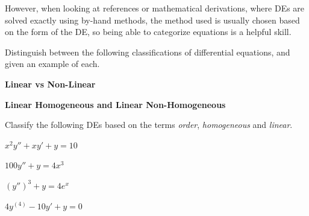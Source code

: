 However, when looking at references or mathematical derivations, where
DEs are solved exactly using by-hand methods, the method used is
usually chosen based on the form of the DE, so being able to
categorize equations is a helpful skill.

\newpage

\problem Distinguish between the following classifications of
differential equations, and given an example of each.

{\bf Linear vs Non-Linear}
\vfill

{\bf Linear Homogeneous and Linear Non-Homogeneous}
\vfill


 

\newpage 
Classify the following DEs based on the terms {\em order}, {\em
  homogeneous} and {\em linear}.

\vfill

$x^2 y'' + x y' + y = 10$ \vfill

 $ 100 y'' +  y = 4x^3$
 \vfill

 $ (y'')^3 + y = 4 e^{x}$
 \vfill

 $ 4 y^{(4)} - 10 y' + y = 0 $ \vfill





